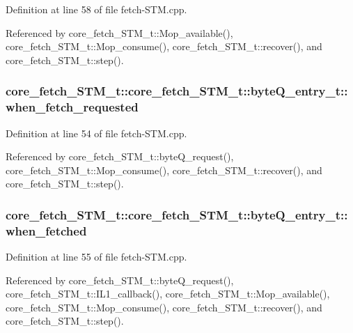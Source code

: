 Definition at line 58 of file fetch-STM.cpp.

Referenced by core\_\-fetch\_\-STM\_\-t::Mop\_\-available(), core\_\-fetch\_\-STM\_\-t::Mop\_\-consume(), core\_\-fetch\_\-STM\_\-t::recover(), and core\_\-fetch\_\-STM\_\-t::step().
\subsubsection[{when\_\-fetch\_\-requested}]{ core\_\-fetch\_\-STM\_\-t::core\_\-fetch\_\-STM\_\-t::byteQ\_\-entry\_\-t::when\_\-fetch\_\-requested}\label{structcore__fetch__STM__t_1_1byteQ__entry__t_390df8e9d3f035be4e234214c55577c1}




Definition at line 54 of file fetch-STM.cpp.

Referenced by core\_\-fetch\_\-STM\_\-t::byteQ\_\-request(), core\_\-fetch\_\-STM\_\-t::Mop\_\-consume(), core\_\-fetch\_\-STM\_\-t::recover(), and core\_\-fetch\_\-STM\_\-t::step().
\subsubsection[{when\_\-fetched}]{ core\_\-fetch\_\-STM\_\-t::core\_\-fetch\_\-STM\_\-t::byteQ\_\-entry\_\-t::when\_\-fetched}\label{structcore__fetch__STM__t_1_1byteQ__entry__t_239fbb5df474d5fc82780dfcf98cb214}




Definition at line 55 of file fetch-STM.cpp.

Referenced by core\_\-fetch\_\-STM\_\-t::byteQ\_\-request(), core\_\-fetch\_\-STM\_\-t::IL1\_\-callback(), core\_\-fetch\_\-STM\_\-t::Mop\_\-available(), core\_\-fetch\_\-STM\_\-t::Mop\_\-consume(), core\_\-fetch\_\-STM\_\-t::recover(), and core\_\-fetch\_\-STM\_\-t::step().
